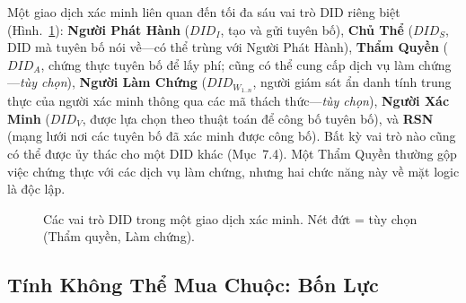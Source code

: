 \documentclass[11pt,a4paper,twocolumn]{article}
\begin{document}
Một giao dịch xác minh liên quan đến tối đa sáu vai trò DID riêng biệt (Hình.~\ref{fig:roles}): \textbf{Người Phát Hành} ($DID_I$, tạo và gửi tuyên bố), \textbf{Chủ Thể} ($DID_S$, DID mà tuyên bố nói về---có thể trùng với Người Phát Hành), \textbf{Thẩm Quyền} ($DID_A$, chứng thực tuyên bố để lấy phí; cũng có thể cung cấp dịch vụ làm chứng---\emph{tùy chọn}), \textbf{Người Làm Chứng} ($DID_{W_{1..n}}$, người giám sát ẩn danh tính trung thực của người xác minh thông qua các mã thách thức---\emph{tùy chọn}), \textbf{Người Xác Minh} ($DID_V$, được lựa chọn theo thuật toán để công bố tuyên bố), và \textbf{RSN} (mạng lưới nơi các tuyên bố đã xác minh được công bố). Bất kỳ vai trò nào cũng có thể được ủy thác cho một DID khác (Mục~7.4). Một Thẩm Quyền thường gộp việc chứng thực với các dịch vụ làm chứng, nhưng hai chức năng này về mặt logic là độc lập.

\begin{figure}[ht]
\centering
{}
\caption{Các vai trò DID trong một giao dịch xác minh. Nét đứt = tùy chọn (Thẩm quyền, Làm chứng).}
\label{fig:roles}
\end{figure}

\subsection{Tính Không Thể Mua Chuộc: Bốn Lực}
\end{document}
